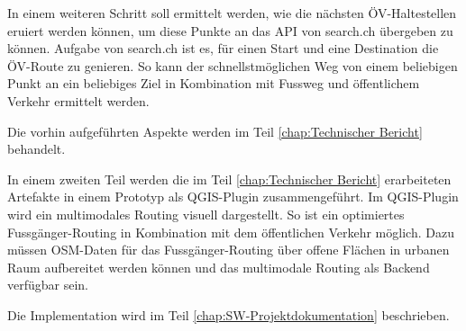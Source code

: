In einem weiteren Schritt soll ermittelt werden, wie die nächsten ÖV-Haltestellen eruiert werden können, um diese Punkte an das \ac{API} von search.ch \cite{search_ch_route_api} übergeben zu können. Aufgabe von search.ch ist es, für einen Start und eine Destination die ÖV-Route zu genieren. So kann der schnellstmöglichen Weg von einem beliebigen Punkt an ein beliebiges Ziel in Kombination mit Fussweg und öffentlichem Verkehr ermittelt werden.

Die vorhin aufgeführten Aspekte werden im Teil \ref{chap:Technischer Bericht} behandelt.

In einem zweiten Teil werden die im Teil \ref{chap:Technischer Bericht} erarbeiteten Artefakte in einem Prototyp als QGIS-Plugin zusammengeführt. Im QGIS-Plugin wird ein multimodales Routing visuell dargestellt. So ist ein optimiertes Fussgänger-Routing in Kombination mit dem öffentlichen Verkehr möglich. Dazu müssen \ac{OSM}-Daten für das Fussgänger-Routing über offene Flächen in urbanen Raum aufbereitet werden können und das multimodale Routing als Backend verfügbar sein.

Die Implementation wird im Teil \ref{chap:SW-Projektdokumentation} beschrieben.
